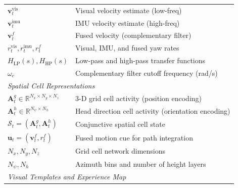 {\begin{longtable}{p{}p{}}
            $\mathbf{v}_t^{\text{vis}}$                                 & Visual velocity estimate (low-freq)                                  \\
            $\mathbf{v}_t^{\text{imu}}$                                 & IMU velocity estimate (high-freq)                                    \\
            $\mathbf{v}_t^f$                                            & Fused velocity (complementary filter)                                \\
            $r_t^{\text{vis}}, r_t^{\text{imu}}, r_t^f$                 & Visual, IMU, and fused yaw rates                                     \\
            $H_{\text{LP}}(s), H_{\text{HP}}(s)$                        & Low-pass and high-pass transfer functions                            \\
            $\omega_c$                                                  & Com\-ple\-men\-tary filter cutoff frequency (rad/s)                  \\
            \midrule
            \multicolumn{2}{l}{\textit{Spatial Cell Representations}}                                                                          \\
            $\mathbf{A}_t^g \in \mathbb{R}^{N_x \times N_y \times N_z}$ & 3-D grid cell activity (position encoding)                           \\
            $\mathbf{A}_t^h \in \mathbb{R}^{N_\psi \times N_h}$         & Head direction cell activity (orientation encoding)                  \\
            $\mathcal{S}_t = (\mathbf{A}_t^g, \mathbf{A}_t^h)$          & Conjunctive spatial cell state                                       \\
            $\mathbf{u}_t = (\mathbf{v}_t^f, r_t^f)$                    & Fused motion cue for path integration                                \\
            $N_x, N_y, N_z$                                             & Grid cell network dimensions                                         \\
            $N_\psi, N_h$                                               & Azimuth bins and number of height layers                             \\
            \midrule
            \multicolumn{2}{l}{\textit{Visual Templates and Experience Map}}                                                                   \\

\end{longtable}}
